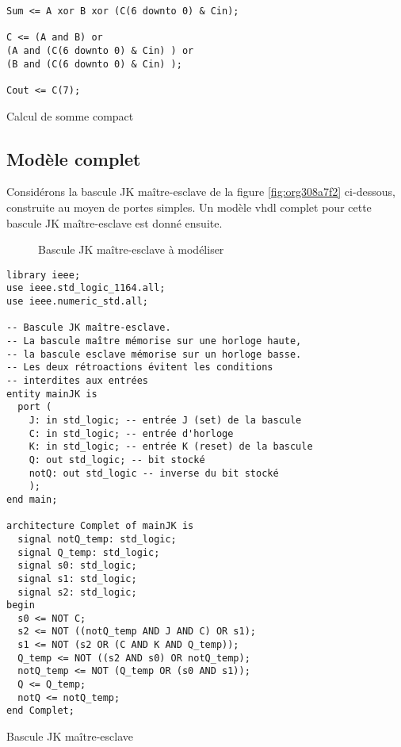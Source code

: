 \documentclass[11pt]{article}
\begin{document}
\begin{listing}[htbp]
\begin{verbatim}
Sum <= A xor B xor (C(6 downto 0) & Cin);

C <= (A and B) or
(A and (C(6 downto 0) & Cin) ) or
(B and (C(6 downto 0) & Cin) );

Cout <= C(7);
\end{verbatim}
\caption{Calcul de somme compact}
\end{listing}

\subsection{Modèle complet}
\label{sec:org1412189}

Considérons la bascule JK maître-esclave de la figure \ref{fig:org308a7f2}
ci-dessous, construite au moyen de portes simples.  Un modèle
vhdl complet pour cette bascule JK maître-esclave est donné ensuite.

\begin{figure}[htbp]
\centering

\caption{\label{fig:orgfbc2cd7}Bascule JK maître-esclave à modéliser}
\end{figure}


\begin{listing}[htbp]
\begin{verbatim}
library ieee;
use ieee.std_logic_1164.all;
use ieee.numeric_std.all;

-- Bascule JK maître-esclave.
-- La bascule maître mémorise sur une horloge haute, 
-- la bascule esclave mémorise sur un horloge basse. 
-- Les deux rétroactions évitent les conditions 
-- interdites aux entrées 
entity mainJK is
  port (
    J: in std_logic; -- entrée J (set) de la bascule
    C: in std_logic; -- entrée d'horloge
    K: in std_logic; -- entrée K (reset) de la bascule
    Q: out std_logic; -- bit stocké
    notQ: out std_logic -- inverse du bit stocké
    );
end main;

architecture Complet of mainJK is
  signal notQ_temp: std_logic;
  signal Q_temp: std_logic;
  signal s0: std_logic;
  signal s1: std_logic;
  signal s2: std_logic;
begin
  s0 <= NOT C;
  s2 <= NOT ((notQ_temp AND J AND C) OR s1);
  s1 <= NOT (s2 OR (C AND K AND Q_temp));
  Q_temp <= NOT ((s2 AND s0) OR notQ_temp);
  notQ_temp <= NOT (Q_temp OR (s0 AND s1));
  Q <= Q_temp;
  notQ <= notQ_temp;
end Complet;
\end{verbatim}
\caption{Bascule JK maître-esclave}
\end{listing}
\end{document}
